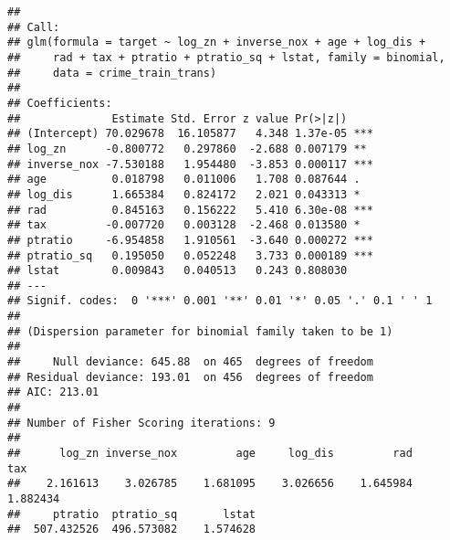 \documentclass[
]{article}
\newenvironment{Shaded}{\begin{snugshade}}{\end{snugshade}}
\newcommand{\AttributeTok}[1]{\textcolor[rgb]{0.13,0.29,0.53}{#1}}
\newcommand{\CommentTok}[1]{\textcolor[rgb]{0.56,0.35,0.01}{\textit{#1}}}
\newcommand{\DecValTok}[1]{\textcolor[rgb]{0.00,0.00,0.81}{#1}}
\newcommand{\FunctionTok}[1]{\textcolor[rgb]{0.13,0.29,0.53}{\textbf{#1}}}
\newcommand{\NormalTok}[1]{#1}
\newcommand{\OtherTok}[1]{\textcolor[rgb]{0.56,0.35,0.01}{#1}}
\newcommand{\SpecialCharTok}[1]{\textcolor[rgb]{0.81,0.36,0.00}{\textbf{#1}}}
\newcommand{\StringTok}[1]{\textcolor[rgb]{0.31,0.60,0.02}{#1}}
\begin{document}
\begin{verbatim}
## 
## Call:
## glm(formula = target ~ log_zn + inverse_nox + age + log_dis + 
##     rad + tax + ptratio + ptratio_sq + lstat, family = binomial, 
##     data = crime_train_trans)
## 
## Coefficients:
##              Estimate Std. Error z value Pr(>|z|)    
## (Intercept) 70.029678  16.105877   4.348 1.37e-05 ***
## log_zn      -0.800772   0.297860  -2.688 0.007179 ** 
## inverse_nox -7.530188   1.954480  -3.853 0.000117 ***
## age          0.018798   0.011006   1.708 0.087644 .  
## log_dis      1.665384   0.824172   2.021 0.043313 *  
## rad          0.845163   0.156222   5.410 6.30e-08 ***
## tax         -0.007720   0.003128  -2.468 0.013580 *  
## ptratio     -6.954858   1.910561  -3.640 0.000272 ***
## ptratio_sq   0.195050   0.052248   3.733 0.000189 ***
## lstat        0.009843   0.040513   0.243 0.808030    
## ---
## Signif. codes:  0 '***' 0.001 '**' 0.01 '*' 0.05 '.' 0.1 ' ' 1
## 
## (Dispersion parameter for binomial family taken to be 1)
## 
##     Null deviance: 645.88  on 465  degrees of freedom
## Residual deviance: 193.01  on 456  degrees of freedom
## AIC: 213.01
## 
## Number of Fisher Scoring iterations: 9
## 
##      log_zn inverse_nox         age     log_dis         rad         tax 
##    2.161613    3.026785    1.681095    3.026656    1.645984    1.882434 
##     ptratio  ptratio_sq       lstat 
##  507.432526  496.573082    1.574628
\end{verbatim}

\begin{Shaded}
\end{Shaded}
\end{document}
